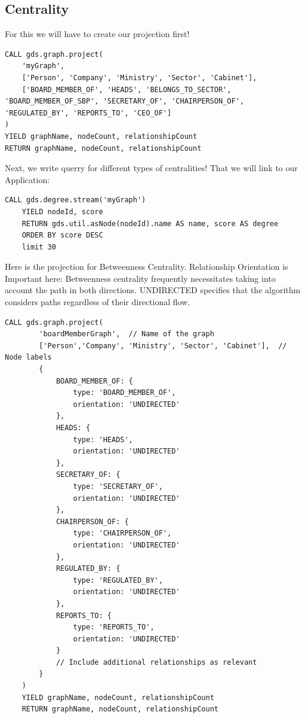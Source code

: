 \documentclass[12pt]{article}
\begin{document}
\subsection{Centrality}
For this we will have to create our projection first!
\begin{lstlisting}[frame=single]
CALL gds.graph.project(
    'myGraph',  
    ['Person', 'Company', 'Ministry', 'Sector', 'Cabinet'],
    ['BOARD_MEMBER_OF', 'HEADS', 'BELONGS_TO_SECTOR', 'BOARD_MEMBER_OF_SBP', 'SECRETARY_OF', 'CHAIRPERSON_OF', 'REGULATED_BY', 'REPORTS_TO', 'CEO_OF']  
)
YIELD graphName, nodeCount, relationshipCount
RETURN graphName, nodeCount, relationshipCount
\end{lstlisting}
Next, we write querry for different types of centralities! That we will link to our Application:
\begin{lstlisting}[frame=single]
    CALL gds.degree.stream('myGraph')
    YIELD nodeId, score
    RETURN gds.util.asNode(nodeId).name AS name, score AS degree
    ORDER BY score DESC
    limit 30
\end{lstlisting}
Here is the projection for Betweenness Centrality. Relationship Orientation is Important here: Betweenness centrality frequently necessitates taking into account the path in both directions. UNDIRECTED specifies that the algorithm considers paths regardless of their directional flow.
\begin{lstlisting}[frame=single]
    CALL gds.graph.project(
        'boardMemberGraph',  // Name of the graph
        ['Person','Company', 'Ministry', 'Sector', 'Cabinet'],  // Node labels
        {
            BOARD_MEMBER_OF: {
                type: 'BOARD_MEMBER_OF',
                orientation: 'UNDIRECTED'
            },
            HEADS: {
                type: 'HEADS',
                orientation: 'UNDIRECTED'
            },
            SECRETARY_OF: {
                type: 'SECRETARY_OF',
                orientation: 'UNDIRECTED'
            },
            CHAIRPERSON_OF: {
                type: 'CHAIRPERSON_OF',
                orientation: 'UNDIRECTED'
            },
            REGULATED_BY: {
                type: 'REGULATED_BY',
                orientation: 'UNDIRECTED'
            },
            REPORTS_TO: {
                type: 'REPORTS_TO',
                orientation: 'UNDIRECTED'
            }
            // Include additional relationships as relevant
        }
    )
    YIELD graphName, nodeCount, relationshipCount
    RETURN graphName, nodeCount, relationshipCount
\end{lstlisting}
\end{document}
